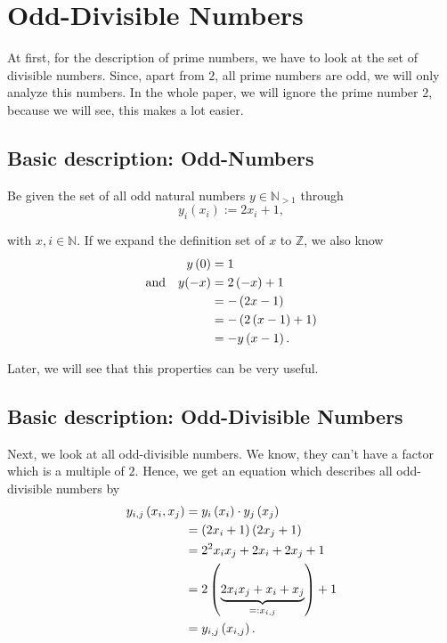 \chapter{Odd-Divisible Numbers}
\label{ch:odddivisiblenumbers}
\minitoc
At first, for the description of prime numbers, we have to look at the set of divisible numbers. Since, apart from $2$, all prime numbers are odd, we will only analyze this numbers. In the whole paper, we will ignore the prime number $2$, because we will see, this makes a lot easier.
\section{Basic description: Odd-Numbers}
\label{s:basicdescriptionoddnumbers}
Be given the set of all odd natural numbers $y \in \mathbb{N}_{> 1}$ through
\begin{equation}
y_{i}\left(x_{i}\right) := 2x_{i} + 1,
\label{eq:oddnatnumbers}
\end{equation}

with $x,i \in \mathbb{N}$. If we expand the definition set of $x$ to $\mathbb{Z}$, we also know
\begin{alignat}{3}
	y\left(0\right) &= 1 \\
	\mathrm{and} \quad y(-x) &= 2\left(-x\right) + 1 \notag \\
	&= -\left(2x - 1\right) \notag \\
	&= -\left(2\left(x-1\right) + 1\right) \notag \\ 
	&= -y\left(x-1\right).
\label{eq:xexpandtoZ}
\end{alignat}

Later, we will see that this properties can be very useful.
\section{Basic description: Odd-Divisible Numbers}
\label{s:basicdescriptionodddivisiblenumbers}
Next, we look at all odd-divisible numbers. We know, they can't have a factor which is a multiple of $2$. Hence, we get an equation which describes all odd-divisible numbers by
\begin{alignat}{3}
	y_{i,j}\left(x_{i},x_{j}\right) &= y_{i}\left(x_{i}\right) \cdot y_{j}\left(x_{j}\right) \notag \\
	&= \left(2x_{i} + 1\right)\left(2x_{j} + 1\right) \notag \\
	&= 2^{2} x_{i} x_{j} + 2x_{i} + 2x_{j} + 1 \notag \\
	&= 2\left(\underbrace{2x_{i}x_{j} + x_{i} + x_{j}}_{=:x_{i,j}}\right) + 1 \notag \\
	&= y_{i,j}\left(x_{i,j}\right).
\label{eq:odddivnumbers}
\end{alignat}

